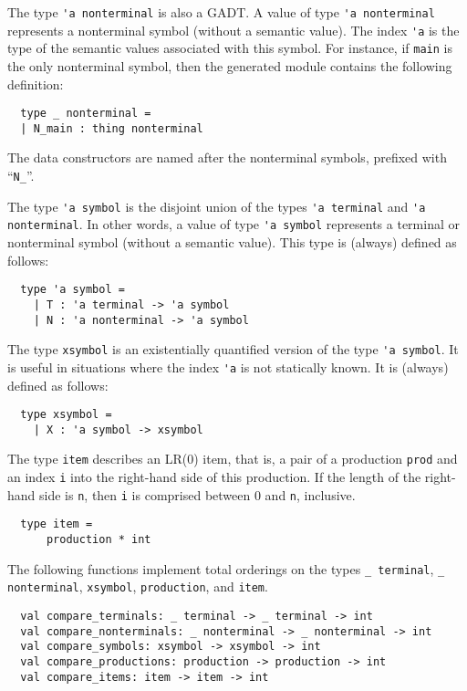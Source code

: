 \documentclass[onecolumn,11pt,nocopyrightspace,preprint]{sigplanconf}
\begin{document}
The type \verb+'a nonterminal+ is also a GADT. A value of type
\verb+'a nonterminal+ represents a nonterminal symbol (without a semantic value). The
index \verb+'a+ is the type of the semantic values associated with this
symbol. For instance, if \verb+main+ is the only nonterminal symbol,
then the generated
module \menhirinterpreter contains the following definition:
%
\begin{verbatim}
  type _ nonterminal =
  | N_main : thing nonterminal
\end{verbatim}
%
The data constructors are named after the nonterminal symbols, prefixed with ``\verb+N_+''.


The type \verb+'a symbol+
is the disjoint union of the types \verb+'a terminal+ and \verb+'a nonterminal+.
In other words, a value of type \verb+'a symbol+ represents a terminal or nonterminal symbol (without
a semantic value).
This type is (always) defined as follows:
%
\begin{verbatim}
  type 'a symbol =
    | T : 'a terminal -> 'a symbol
    | N : 'a nonterminal -> 'a symbol
\end{verbatim}


The type \verb+xsymbol+ is an existentially quantified version of the
type \verb+'a symbol+. It is useful in situations where the index \verb+'a+ is
not statically known. It is (always) defined as follows:
%
\begin{verbatim}
  type xsymbol =
    | X : 'a symbol -> xsymbol
\end{verbatim}


The type \verb+item+ describes an LR(0) item, that is, a pair of a production
\verb+prod+ and an index \verb+i+ into the right-hand side of this production.
If the length of the right-hand side is \verb+n+, then \verb+i+ is
comprised between 0 and \verb+n+, inclusive.

\begin{verbatim}
  type item =
      production * int
\end{verbatim}


The following functions implement total orderings on the types
\verb+_ terminal+, \verb+_ nonterminal+, \verb+xsymbol+,
\verb+production+, and \verb+item+.

\begin{verbatim}
  val compare_terminals: _ terminal -> _ terminal -> int
  val compare_nonterminals: _ nonterminal -> _ nonterminal -> int
  val compare_symbols: xsymbol -> xsymbol -> int
  val compare_productions: production -> production -> int
  val compare_items: item -> item -> int
\end{verbatim}
\end{document}
